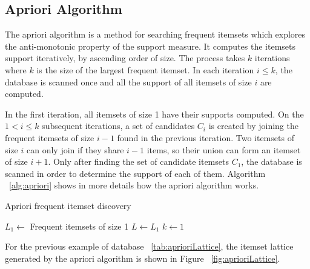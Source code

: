 \subsection{Apriori Algorithm}
The apriori algorithm is a method for searching frequent itemsets which explores the anti-monotonic property of the
support measure. It computes the itemsets support iteratively, by ascending order of size. The
process takes $k$ iterations where $k$ is the size of the largest frequent itemset. In each iteration $i \leq k$, the
database is scanned once and all the support of all itemsets of size $i$ are computed.

In the first iteration, all itemsets of size 1 have their supports computed. On the $1 < i \leq k$ subsequent
iterations, a set of candidates $C_i$ is created by joining the frequent itemsets of size $i-1$ found in the previous
iteration. Two itemsets of size $i$ can only join if they share $i-1$ items, so their union can form an itemset of
size
$i+1$. Only after finding the set of candidate itemsets $C_1$, the database is scanned in order to determine the
support of each of them. Algorithm ~\ref{alg:apriori} shows in more details how the apriori algorithm works.

\begin{algorithm}[h!]
  \caption{Apriori frequent itemset discovery}
  \label{alg:apriori}

  $L_1 \leftarrow$ Frequent itemsets of size 1 \;
  $L \leftarrow L_1$ \;
  $k \leftarrow 1$ \;
   \;
\end{algorithm}

For the previous example of database ~\ref{tab:aprioriLattice}, the itemset lattice generated by the apriori algorithm
is shown in Figure ~\ref{fig:aprioriLattice}. 

